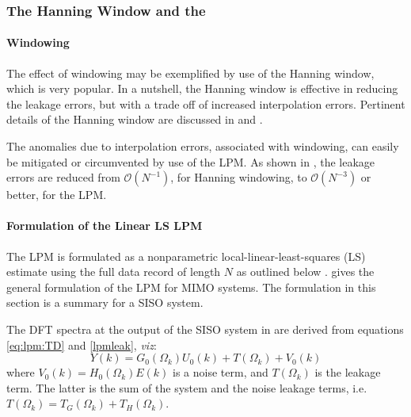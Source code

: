\subsubsection{The Hanning Window and the }\label{se:LPMFRFest}%
\paragraph{Windowing}
The effect of windowing may be  exemplified by use of the Hanning window, which is very popular.
In a nutshell, the Hanning window is effective in reducing  the leakage errors, but  with a trade off of increased interpolation errors. %
Pertinent details of the Hanning window are discussed in \citep{Schoukens2006LPM,Antoni2007FRF,Schoukens2009LPM,Wellstead1981} and \citep{Harris1978}.

The anomalies due to interpolation errors, associated with windowing, can easily be mitigated or circumvented by use of the \gls{LPM}. As shown in \citep{Pintelon2012}, the leakage errors are reduced from  $\mathcal{O}({N}^{-1})$, for Hanning windowing, to $\mathcal{O}({N}^{-3})$ or better, for the \gls{LPM}.


\paragraph{Formulation of the Linear LS LPM}
The \gls{LPM} is formulated as a nonparametric local-linear-least-squares (LS) estimate using the full data record of length $N$ as outlined below \citep{Schoukens2009LPM}.
\citet[Section 7.2.2]{Pintelon2012} gives the general formulation of the \gls{LPM} for \gls{MIMO} systems.
The formulation in this section is a summary for a \gls{SISO} system.

The \gls{DFT} spectra at the output of the \gls{SISO} system in  are derived from equations \eqref{eq:lpm:TD} and \eqref{lpmleak}, \emph{viz}:
\begin{equation}\label{lpm1spectra}
Y(k)=G_0(\Omega_k)U_0(k)+T(\Omega_k)+V_0(k)
\end{equation}
where $V_0(k) = H_0(\Omega_k)E(k)$ is a noise term, and $T(\Omega_k)$ is the leakage term. The latter is the sum of the system and the noise leakage terms, i.e. $T(\Omega_k) = T_G(\Omega_k) + T_H(\Omega_k)$.

